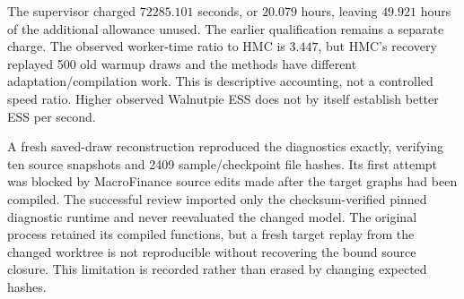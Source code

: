 The supervisor charged $72285.101$ seconds, or $20.079$ hours, leaving
$49.921$ hours of the additional allowance unused. The earlier qualification
remains a separate charge. The observed worker-time ratio to HMC is
$3.447$, but HMC's recovery replayed 500 old warmup draws and the methods
have different adaptation/compilation work. This is descriptive accounting,
not a controlled speed ratio. Higher observed Walnutpie ESS does not by
itself establish better ESS per second.

A fresh saved-draw reconstruction reproduced the diagnostics exactly,
verifying ten source snapshots and 2409 sample/checkpoint file hashes.
Its first attempt was blocked by MacroFinance source edits made after
the target graphs had been compiled. The successful review imported only
the checksum-verified pinned diagnostic runtime and never reevaluated the
changed model. The original process retained its compiled functions, but
a fresh target replay from the changed worktree is not reproducible
without recovering the bound source closure. This limitation is recorded
rather than erased by changing expected hashes.
